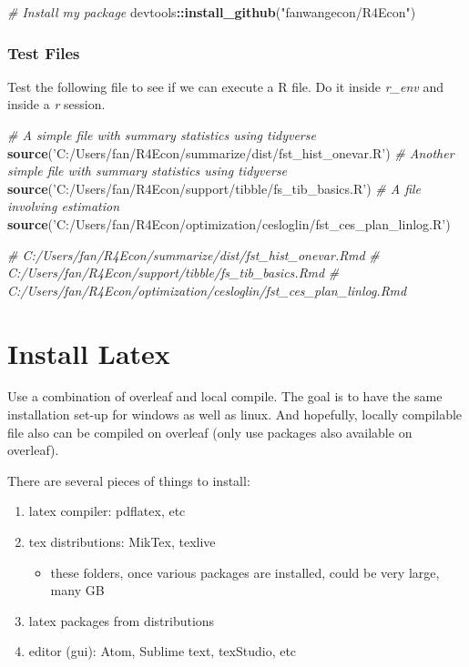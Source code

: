 \documentclass[]{article}
\newenvironment{Shaded}{\begin{snugshade}}{\end{snugshade}}
\newcommand{\CommentTok}[1]{\textcolor[rgb]{0.56,0.35,0.01}{\textit{#1}}}
\newcommand{\KeywordTok}[1]{\textcolor[rgb]{0.13,0.29,0.53}{\textbf{#1}}}
\newcommand{\NormalTok}[1]{#1}
\newcommand{\OperatorTok}[1]{\textcolor[rgb]{0.81,0.36,0.00}{\textbf{#1}}}
\newcommand{\StringTok}[1]{\textcolor[rgb]{0.31,0.60,0.02}{#1}}
\providecommand{\tightlist}{%
  \setlength{\itemsep}{0pt}\setlength{\parskip}{0pt}}
\begin{document}
\begin{Shaded}
\begin{Highlighting}[]
\CommentTok{# Install my package}
\NormalTok{devtools}\OperatorTok{::}\KeywordTok{install_github}\NormalTok{(}\StringTok{"fanwangecon/R4Econ"}\NormalTok{)}
\end{Highlighting}
\end{Shaded}

\hypertarget{test-files}{%
\subsubsection{Test Files}\label{test-files}}

Test the following file to see if we can execute a R file. Do it inside
\emph{r\_env} and inside a \emph{r} session.

\begin{Shaded}
\begin{Highlighting}[]
\CommentTok{# A simple file with summary statistics using tidyverse}
\KeywordTok{source}\NormalTok{(}\StringTok{'C:/Users/fan/R4Econ/summarize/dist/fst_hist_onevar.R'}\NormalTok{)}
\CommentTok{# Another simple file with summary statistics using tidyverse}
\KeywordTok{source}\NormalTok{(}\StringTok{'C:/Users/fan/R4Econ/support/tibble/fs_tib_basics.R'}\NormalTok{)}
\CommentTok{# A file involving estimation}
\KeywordTok{source}\NormalTok{(}\StringTok{'C:/Users/fan/R4Econ/optimization/cesloglin/fst_ces_plan_linlog.R'}\NormalTok{)}

\CommentTok{# C:/Users/fan/R4Econ/summarize/dist/fst_hist_onevar.Rmd}
\CommentTok{# C:/Users/fan/R4Econ/support/tibble/fs_tib_basics.Rmd}
\CommentTok{# C:/Users/fan/R4Econ/optimization/cesloglin/fst_ces_plan_linlog.Rmd}
\end{Highlighting}
\end{Shaded}

\hypertarget{install-latex}{%
\section{Install Latex}\label{install-latex}}

Use a combination of overleaf and local compile. The goal is to have the
same installation set-up for windows as well as linux. And hopefully,
locally compilable file also can be compiled on overleaf (only use
packages also available on overleaf).

There are several pieces of things to install:

\begin{enumerate}
\def\labelenumi{\arabic{enumi}.}
\tightlist
\item
  latex compiler: pdflatex, etc
\item
  tex distributions: MikTex, texlive

  \begin{itemize}
  \tightlist
  \item
    these folders, once various packages are installed, could be very
    large, many GB
  \end{itemize}
\item
  latex packages from distributions
\item
  editor (gui): Atom, Sublime text, texStudio, etc
\end{enumerate}
\end{document}
